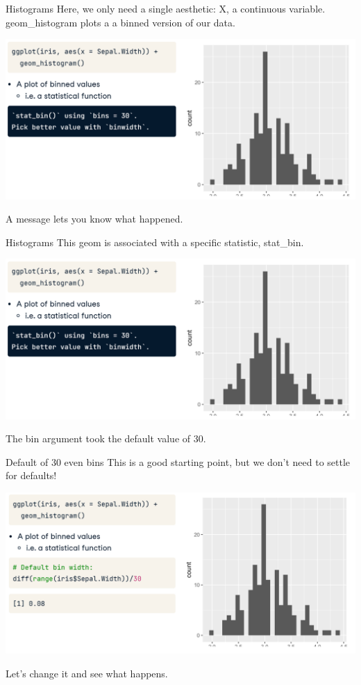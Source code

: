 \documentclass[
  ignorenonframetext,
]{beamer}
\begin{document}
\begin{frame}{Histograms}
\label{histograms-1}
Here, we only need a single aesthetic: X, a continuous variable.
geom\_histogram plots a a binned version of our data.

\includegraphics{../images/im199.png}

A message lets you know what happened.
\end{frame}

\begin{frame}{Histograms}
\label{histograms-2}
This geom is associated with a specific statistic, stat\_bin.

\includegraphics{../images/im199.png}

The bin argument took the default value of 30.
\end{frame}

\begin{frame}{Default of 30 even bins}
\label{default-of-30-even-bins}
This is a good starting point, but we don't need to settle for defaults!

\includegraphics{../images/im200.png}

Let's change it and see what happens.
\end{frame}
\end{document}
